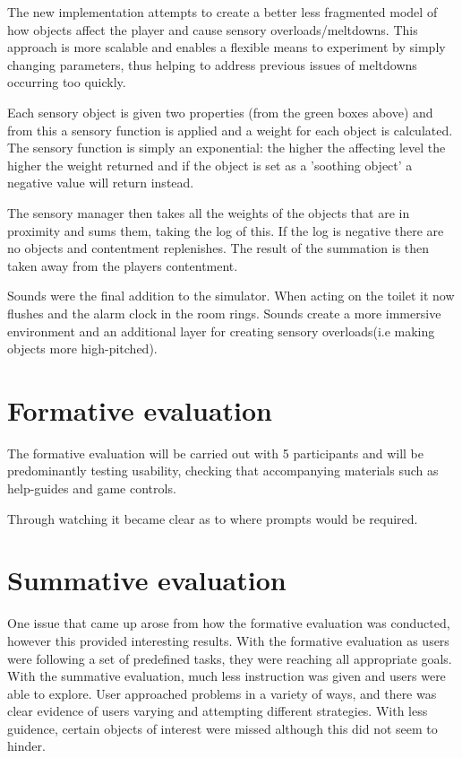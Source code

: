 \documentclass[11pt]{report}
\begin{document}
The new implementation attempts to create a better less fragmented model of how objects affect the player and cause sensory overloads/meltdowns. This approach is more scalable and enables a flexible means to experiment by simply changing parameters, thus helping to address previous issues of meltdowns occurring too quickly.

Each sensory object is given two properties (from the green boxes above) and from this a sensory function is applied and a weight for each object is calculated. The sensory function is simply an exponential: the higher the affecting level the higher the weight returned and if the object is set as a 'soothing object' a negative value will return instead. 

The sensory manager then takes all the weights of the objects that are in proximity and sums them, taking the log of this. If the log is negative there are no objects and contentment replenishes. The result of the summation is then taken away from the players contentment. 

Sounds were the final addition to the simulator. When acting on the toilet it now flushes and the alarm clock in the room rings. Sounds create a more immersive environment and an additional layer for creating sensory overloads(i.e making objects more high-pitched). 

\chapter{Formative evaluation}
The formative evaluation will be carried out with 5 participants and will be predominantly testing usability, checking that accompanying materials such as help-guides and game controls.

Through watching it became clear as to where prompts would be required. 

\chapter{Summative evaluation}

One issue that came up arose from how the formative evaluation was conducted, however this provided interesting results. With the formative evaluation as users were following a set of predefined tasks, they were reaching all appropriate goals. With the summative evaluation, much less instruction was given and users were able to explore.
User approached problems in a variety of ways, and there was clear evidence of users varying and attempting different strategies. With less guidence, certain objects of interest were missed although this did not seem to hinder.
\end{document}
